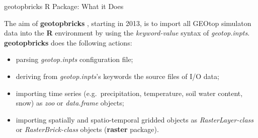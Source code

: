 \documentclass[ignorenonframetext,]{beamer}
\providecommand{\tightlist}{%
  \setlength{\itemsep}{0pt}\setlength{\parskip}{0pt}}
\begin{document}
\begin{frame}{geotopbricks R Package: What it Does}

The aim of \textbf{geotopbricks} , starting in 2013, is to import all
GEOtop simulaton data into the \textbf{R} environment by using the
\emph{keyword-value} syntax of \emph{geotop.inpts}.
\textbf{geotopbricks} does the following actions:

\begin{itemize}
\tightlist
\item
  parsing \emph{geotop.inpts} configuration file;
\item
  deriving from \emph{geotop.inpts}'s keywords the source files of I/O
  data;
\item
  importing time series (e.g.~precipitation, temperature, soil water
  content, snow) as \emph{zoo} or \emph{data.frame} objects;
\item
  importing spatially and spatio-temporal gridded objects as
  \emph{RasterLayer-class} or \emph{RasterBrick-class} objects
  (\textbf{raster} package).
\end{itemize}

\end{frame}
\end{document}
